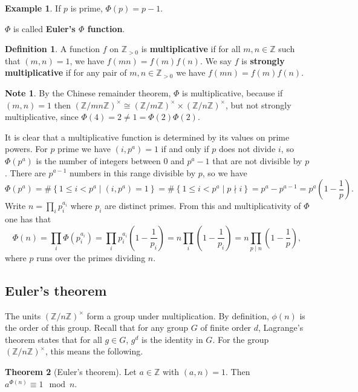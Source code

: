 \documentclass{article}
\newcommand{\Z}{\mathbb{Z}}
\newcommand{\rb}[1]{\left( #1 \right)}
\newcommand{\cb}[1]{\left\{ #1 \right\}}
\newcommand{\unit}[1]{\rb{\Z / #1\Z}^\times}
\theoremstyle{definition}\newtheorem{definition}{Definition}
\theoremstyle{definition}\newtheorem*{remark}{Remark}
\theoremstyle{definition}\newtheorem*{example}{Example}
\theoremstyle{definition}\newtheorem*{note}{Note}
\newtheorem{theorem}[definition]{Theorem}
\begin{document}
\begin{example}
If $ p $ is prime, $ \Phi\rb{p} = p - 1 $.
\end{example}

$ \Phi $ is called \textbf{Euler's $ \Phi $ function}.

\begin{definition}
A function $ f $ on $ \Z_{> 0} $ is \textbf{multiplicative} if for all $ m, n \in \Z $ such that $ \rb{m, n} = 1 $, we have $ f\rb{mn} = f\rb{m}f\rb{n} $. We say $ f $ is \textbf{strongly multiplicative} if for any pair of $ m, n \in \Z_{> 0} $ we have $ f\rb{mn} = f\rb{m}f\rb{n} $.
\end{definition}

\begin{note}
By the Chinese remainder theorem, $ \Phi $ is multiplicative, because if $ \rb{m, n} = 1 $ then $ \unit{mn} \cong \unit{m} \times \unit{n} $, but not strongly multiplicative, since $ \Phi\rb{4} = 2 \ne 1 = \Phi\rb{2}\Phi\rb{2} $.
\end{note}

It is clear that a multiplicative function is determined by its values on prime powers. For $ p $ prime we have $ \rb{i, p^a} = 1 $ if and only if $ p $ does not divide $ i $, so $ \Phi\rb{p^a} $ is the number of integers between $ 0 $ and $ p^a - 1 $ that are not divisible by $ p $. There are $ p^{a - 1} $ numbers in this range divisible by $ p $, so we have
$$ \Phi\rb{p^a} = \#\cb{1 \le i < p^a \mid \rb{i, p^a} = 1} = \#\cb{1 \le i < p^a \mid p \nmid i} = p^a - p^{a - 1} = p^a\rb{1 - \dfrac{1}{p}}. $$
Write $ n = \prod_i p_i^{a_i} $ where $ p_i $ are distinct primes. From this and multiplicativity of $ \Phi $ one has that
$$ \Phi\rb{n} = \prod_i \Phi\rb{p_i^{a_i}} = \prod_i p_i^{a_i}\rb{1 - \dfrac{1}{p_i}} = n\prod_i \rb{1 - \dfrac{1}{p_i}} = n\prod_{p \mid n} \rb{1 - \dfrac{1}{p}}, $$
where $ p $ runs over the primes dividing $ n $.

\subsection{Euler's theorem}

The units $ \unit{n} $ form a group under multiplication. By definition, $ \phi\rb{n} $ is the order of this group. Recall that for any group $ G $ of finite order $ d $, Lagrange's theorem states that for all $ g \in G $, $ g^d $ is the identity in $ G $. For the group $ \unit{n} $, this means the following.

\begin{theorem}[Euler's theorem]
\label{thm:16}
Let $ a \in \Z $ with $ \rb{a, n} = 1 $. Then $ a^{\Phi\rb{n}} \equiv 1 \mod n $.
\end{theorem}
\end{document}
